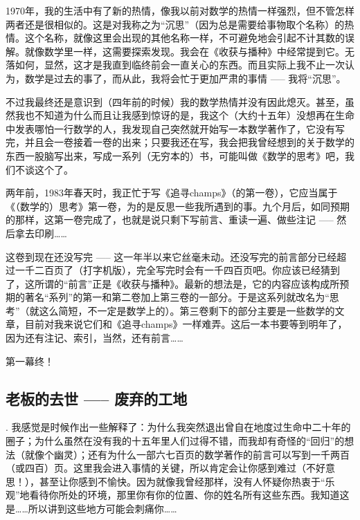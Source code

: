 \documentclass[oneside,12pt]{book}
\begin{document}
1970年，我的生活中有了新的热情，像我以前对数学的热情一样强烈，但不管怎样两者还是很相似的。这是对我称之为“沉思”（因为总是需要给事物取个名称）的热情。这个名称，就像这里会出现的其他名称一样，不可避免地会引起不计其数的误解。就像数学里一样，这需要探索发现。我会在《收获与播种》中经常提到它。无落如何，显然，这才是我直到临终前会一直关心的东西。而且实际上我不止一次认为，数学是过去的事了，而从此，我将会忙于更加严肃的事情 ----- 我将“沉思”。

不过我最终还是意识到（四年前的时候）我的数学热情并没有因此熄灭。甚至，虽然我也不知道为什么而且让我感到惊讶的是，我这个（大约十五年）没想再在生命中发表哪怕一行数学的人，我发现自己突然就开始写一本数学著作了，它没有写完，并且会一卷接着一卷的出来；只要我还在写，我会把我曾经想到的关于数学的东西一股脑写出来，写成一系列（无穷本的\footnotemark）书，可能叫做《数学的思考》吧，我们不谈这个了。

两年前，1983年春天时，我正忙于写《追寻champs》\footnotemark（的第一卷），它应当属于《（数学的）思考》第一卷，为的是反思一些我所遇到的事。九个月后，如同预期的那样，这第一卷完成了，也就是说只剩下写前言、重读一遍、做些注记 ----- 然后拿去印刷……

这卷到现在还没写完 ----- 这一年半以来它丝毫未动。还没写完的前言部分已经超过一千二百页了（打字机版），完全写完时会有一千四百页吧。你应该已经猜到了，这所谓的“前言”正是《收获与播种》。最新的想法是，它的内容应该构成所预期的著名“系列”的第一和第二卷加上第三卷的一部分。于是这系列就改名为“思考”（就这么简短，不一定是数学上的）。第三卷剩下的部分主要是一些数学的文章，目前对我来说它们和《追寻champs》一样难弄。这后一本书要等到明年了，因为还有注记、索引，当然，还有前言……

第一幕终！

\subsection{老板的去世 ----- 废弃的工地}

. 我感觉是时候作出一些解释了：为什么我突然退出曾自在地度过生命中二十年的圈子；为什么虽然在没有我的十五年里人们过得不错，而我却有奇怪的“回归”的想法（就像个幽灵\footnotemark）；还有为什么一部六七百页的数学著作的前言可以写到一千两百（或四百）页。这里我会进入事情的关键，所以肯定会让你感到难过（不好意思！），甚至让你感到不愉快。因为就像我曾经那样，没有人怀疑你热衷于“乐观”地看待你所处的环境，那里你有你的位置、你的姓名所有这些东西。我知道这是……所以讲到这些地方可能会刺痛你……
\end{document}

